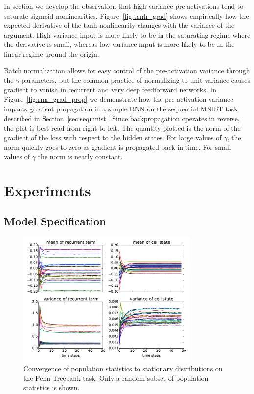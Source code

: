 \documentclass{article} %
\begin{document}
In section we develop the observation that high-variance pre-activations tend to saturate sigmoid nonlinearities.
Figure~\ref{fig:tanh_grad} shows empirically how the expected derivative of the tanh nonlinearity changes with the variance of the argument.
High variance input is more likely to be in the saturating regime where the derivative is small,
whereas low variance input is more likely to be in the linear regime around the origin.

Batch normalization allows for easy control of the pre-activation variance through the $\gamma$ parameters,
but the common practice of normalizing to unit variance causes gradient to vanish in recurrent and very deep feedforward networks.
In Figure~\ref{fig:rnn_grad_prop} we demonstrate how the pre-activation variance impacts gradient propagation in a simple RNN on the sequential MNIST task described in Section~\ref{sec:seqmnist}.
Since backpropagation operates in reverse, the plot is best read from right to left.
The quantity plotted is the norm of the gradient of the loss with respect to the hidden states.
For large values of $\gamma$, the norm quickly goes to zero as gradient is propagated back in time.
For small values of $\gamma$ the norm is nearly constant.


\section{Experiments}
\label{sec:experiments}


\subsection{Model Specification}


\begin{figure}
\center
\includegraphics[width=0.8\textwidth]{figures/popstat_stationarity.pdf}
\caption{Convergence of population statistics to stationary distributions on the Penn Treebank task. Only a random subset of population statistics is shown.}
\label{fig:popstat_stationarity}
\end{figure}
\end{document}
